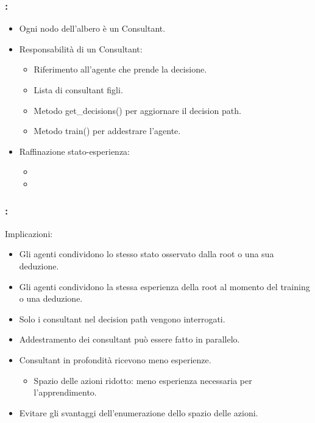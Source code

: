 \documentclass[compress]{beamer}
\begin{document}
\begin{frame}
    \frametitle{\subsecname: \subsubsecname}
    \begin{itemize}
        \item Ogni nodo dell'albero è un Consultant.
        \item Responsabilità di un Consultant:
        \begin{itemize}
            \item Riferimento all'agente che prende la decisione.
            \item Lista di consultant figli.
            \item Metodo get\_decisions() per aggiornare il decision path.
            \item Metodo train() per addestrare l'agente.
        \end{itemize}
        \item Raffinazione stato-esperienza:
        \begin{itemize}
            \item {}
            \item {}
        \end{itemize}
    \end{itemize}
\end{frame}

\begin{frame}
    \frametitle{\subsecname: \subsubsecname}
    Implicazioni:
    \begin{itemize}
        \item Gli agenti condividono lo stesso stato osservato dalla root o una sua deduzione.
        \item Gli agenti condividono la stessa esperienza della root al momento del training o una deduzione.
        \item Solo i consultant nel decision path vengono interrogati.
        \item Addestramento dei consultant può essere fatto in parallelo.
        \item Consultant in profondità ricevono meno esperienze.
        \begin{itemize}
            \item Spazio delle azioni ridotto: meno esperienza necessaria per l'apprendimento.
        \end{itemize}
        \item Evitare gli svantaggi dell'enumerazione dello spazio delle azioni.
    \end{itemize}
\end{frame}
\end{document}
